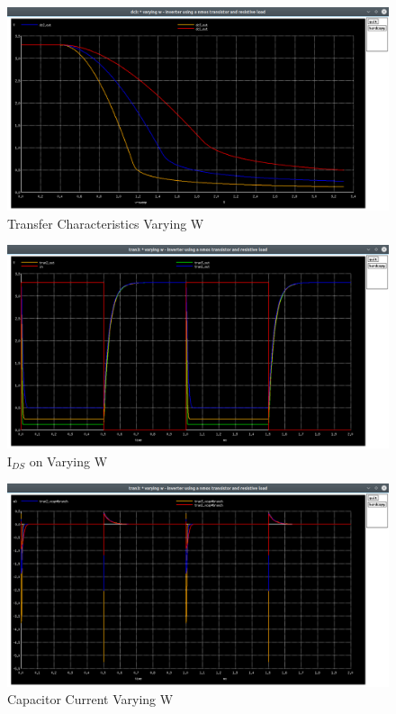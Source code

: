 \documentclass[12pt]{article}
\begin{document}
    \begin{figure}[H]
		\begin{center}
			\includegraphics[scale=0.25]{images/inverter_w_dc.png}
			\caption{Transfer Characteristics Varying W}
			\label{fig::varying_w_dc}
		\end{center}
	\end{figure}
	\begin{figure}[H]
		\begin{center}
			\includegraphics[scale=0.25]{images/inverter_w_tran.png}
			\caption{$\text{I}_{DS}$ on Varying W}
			\label{fig::varying_w_time}
		\end{center}
	\end{figure}
	
	\begin{figure}[H]
		\begin{center}
			\includegraphics[scale=0.25]{images/inverter_w_vcap.png}
			\caption{Capacitor Current Varying W}
			\label{fig::varying_w_vcap}
		\end{center}
	\end{figure}
	
\end{document}
